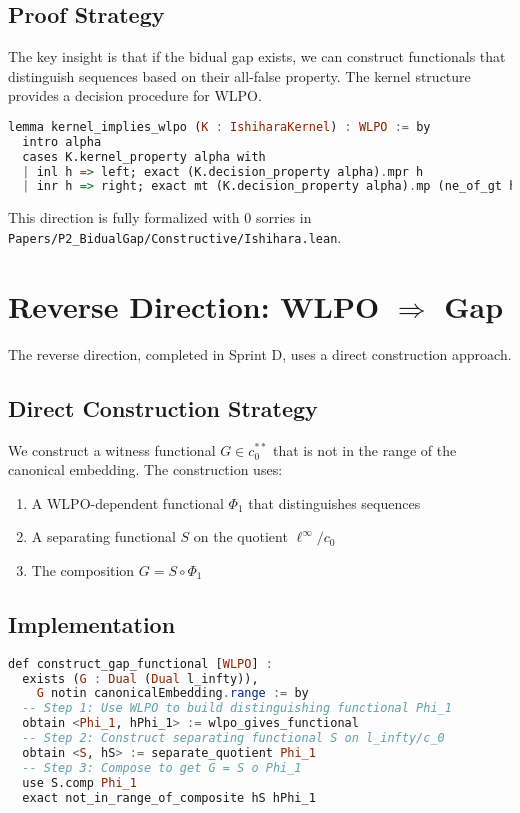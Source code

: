 \documentclass{lmcs}
\begin{document}
\subsection{Proof Strategy}

The key insight is that if the bidual gap exists, we can construct functionals that distinguish sequences based on their all-false property. The kernel structure provides a decision procedure for WLPO.

\begin{lstlisting}[language=Haskell, caption={Kernel implies WLPO}]
lemma kernel_implies_wlpo (K : IshiharaKernel) : WLPO := by
  intro alpha
  cases K.kernel_property alpha with
  | inl h => left; exact (K.decision_property alpha).mpr h
  | inr h => right; exact mt (K.decision_property alpha).mp (ne_of_gt h)
\end{lstlisting}

This direction is fully formalized with 0 sorries in \texttt{Papers/P2\_BidualGap/Constructive/Ishihara.lean}.

\section{Reverse Direction: WLPO $\Rightarrow$ Gap}\label{sec:reverse}

The reverse direction, completed in Sprint D, uses a direct construction approach.

\subsection{Direct Construction Strategy}

We construct a witness functional $G \in c_0^{**}$ that is not in the range of the canonical embedding. The construction uses:
\begin{enumerate}
\item A WLPO-dependent functional $\Phi_1$ that distinguishes sequences
\item A separating functional $S$ on the quotient $\ell^\infty/c_0$
\item The composition $G = S \circ \Phi_1$
\end{enumerate}

\subsection{Implementation}

\begin{lstlisting}[language=Haskell, caption={Direct construction of gap functional}]
def construct_gap_functional [WLPO] : 
  exists (G : Dual (Dual l_infty)), 
    G notin canonicalEmbedding.range := by
  -- Step 1: Use WLPO to build distinguishing functional Phi_1
  obtain <Phi_1, hPhi_1> := wlpo_gives_functional
  -- Step 2: Construct separating functional S on l_infty/c_0
  obtain <S, hS> := separate_quotient Phi_1
  -- Step 3: Compose to get G = S o Phi_1
  use S.comp Phi_1
  exact not_in_range_of_composite hS hPhi_1
\end{lstlisting}
\end{document}
